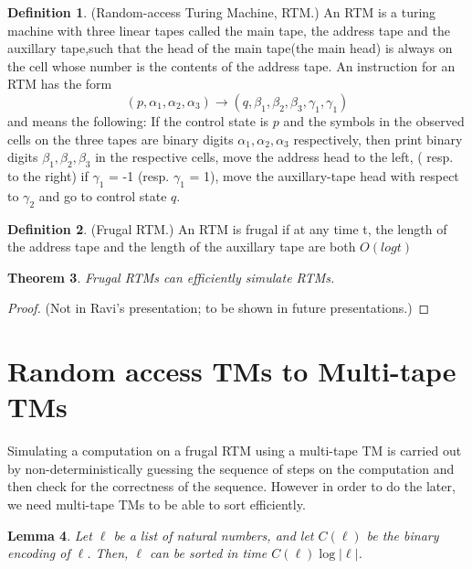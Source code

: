 \documentclass[english]{article}
\theoremstyle{plain}
\newtheorem{thm}{Theorem}
\theoremstyle{definition}
\newtheorem{defn}[thm]{Definition}
\theoremstyle{plain}
\newtheorem{lem}[thm]{Lemma}
\begin{document}
\begin{defn}
  (Random-access Turing Machine, RTM.) An RTM is a turing machine with
  three linear tapes called the main tape, the address tape and the
  auxillary tape,such that the head of the main tape(the main head) is
  always on the cell whose number is the contents of the address
  tape. An instruction for an RTM has the form
  \begin{equation}
    (p,\alpha_1,\alpha_2,\alpha_3) \rightarrow (q,\beta_1,\beta_2,\beta_3,\gamma_1,\gamma_1)
  \end{equation}
  and means the following: If the control state is $p$ and the symbols
  in the observed cells on the three tapes are binary digits
  $\alpha_1,\alpha_2,\alpha_3$ respectively, then print binary digits
  $ \beta_1,\beta_2,\beta_3$ in the respective cells, move the address
  head to the left, ( resp. to the right) if $\gamma_1$ = -1
  (resp. $\gamma_1$ = 1), move the auxillary-tape head with respect to
  $\gamma_2$ and go to control state $q$.
\end{defn}

\begin{defn}
  (Frugal RTM.) An RTM is frugal if at any time t, the length of the
  address tape and the length of the auxillary tape are both $O(log
  t)$
\end{defn}

\begin{thm}
  Frugal RTMs can efficiently simulate RTMs.
\end{thm}

\begin{proof}
  (Not in Ravi's presentation; to be shown in future presentations.)
\end{proof}

\section{Random access TMs to Multi-tape TMs}

Simulating a computation on a frugal RTM using a multi-tape TM is
carried out by non-deterministically guessing the sequence of steps on
the computation and then check for the correctness of the
sequence. However in order to do the later, we need multi-tape TMs to
be able to sort efficiently.

\begin{lem}
  Let $\ell$ be a list of natural numbers, and let $C(\ell)$ be the
  binary encoding of $\ell$. Then, $\ell$ can be sorted in time
  $C(\ell)\log|\ell|$.
\end{lem}
\end{document}
